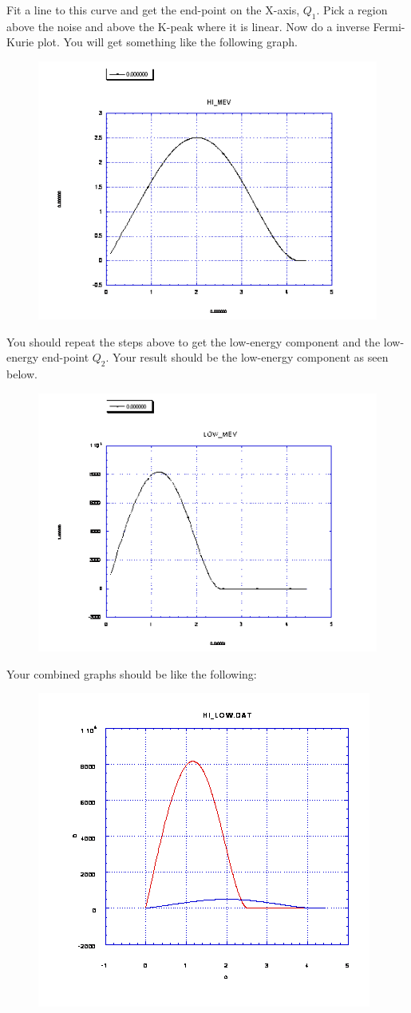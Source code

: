 \documentclass{../lab}
\begin{document}
Fit a line to this curve and get the end-point on the X-axis, $Q_1$. Pick a region above the noise and above the K-peak where it is linear. Now do a inverse Fermi-Kurie plot. You will get something like the following graph.
\begin{figure}[h]
\centering
    \href{http://experimentationlab.berkeley.edu/sites/default/files/images/BRAimage021.gif}{\includegraphics[width=0.5\linewidth]{images/BRAimage021.png}}
    \caption{}
\end{figure}

You should repeat the steps above to get the low-energy component and the low-energy end-point $Q_2$. Your result should be the low-energy component as seen below.
\begin{figure}[h]
\centering
    \href{http://experimentationlab.berkeley.edu/sites/default/files/images/480px-BRAimage020.gif}{\includegraphics[width=0.5\linewidth]{images/480px-BRAimage020.png}}
    \caption{}
\end{figure}

Your combined graphs should be like the following:
\begin{figure}[h]
\centering
    \href{http://experimentationlab.berkeley.edu/sites/default/files/images/BRAimage022.gif}{\includegraphics[width=0.5\linewidth]{images/BRAimage022.png}}
    \caption{}
\end{figure}
\end{document}
